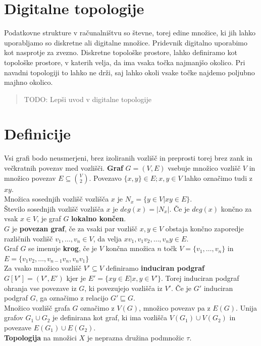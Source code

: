 \documentclass[a4paper, 12pt]{book}
\theoremstyle{definition}
\begin{document}
\section{Digitalne topologije}
Podatkovne strukture v računalništvu so števne, torej edine množice, ki jih lahko
uporabljamo so diskretne ali digitalne množice. Pridevnik digitalno uporabimo kot
nasprotje za zvezno. Diskretne topološke prostore, lahko definiramo kot topološke prostore,
v katerih velja, da ima vsaka točka najmanjšo okolico. Pri navadni topologiji to
lahko ne drži, saj lahko okoli vsake točke najdemo poljubno majhno okolico. 
\begin{quote}
    TODO: Lepši uvod v digitalne topologije
\end{quote}

\section{Definicije}
Vsi grafi bodo neusmerjeni, brez izoliranih vozlišč in preprosti torej brez zank
in večkratnih povezav med vozlišči.
\textbf{Graf} $G = (V,E)$ vsebuje množico vozlišč $V$ in množico povezav $E \subseteq \binom{V}{2}$.
Povezavo $\{x,y\} \in E; x,y \in V$ lahko označimo tudi z $xy$.\\
Množica sosednjih vozlišč vozlišča $x$ je $N_x = \{y \in V | xy \in E\}$.\\
Število sosednjih vozlišč vozlišča $x$ je $deg(x) = |N_x|$. Če je $deg(x)$ končno
za vsak $x \in V$, je graf $G$ \textbf{lokalno končen}.\\
$G$ je \textbf{povezan graf}, če za vsaki par vozlišč $x,y \in V$ obstaja končno
zaporedje različnih vozlišč $v_1,\dots,v_n \in V$, da velja $xv_1, v_1v_2, \dots, v_n y \in E$.\\
Graf $G$ se imenuje \textbf{krog}, če je $V$ končna množica $n$ točk $V=\{v_1,\dots,v_n\}$ in
$E=\{v_1 v_2,\dots,v_{n-1}v_n,v_n v_1\}$ \\
Za vsako množico vozlišč $V' \subseteq V$ definiramo \textbf{induciran podgraf} $G[V'] = (V',E')$
kjer je $E' = \{xy \in E | x,y \in V'\}$. Torej induciran podgraf ohranja vse povezave
iz $G$, ki povezujejo vozlišča iz $V'$. Če je $G'$ induciran podgraf $G$,
ga označimo z relacijo $G' \sqsubseteq  G$.\\
Množico vozlišč grafa $G$ označimo z $V(G)$, množico povezav pa z $E(G)$. Unija
grafov $G_1 \cup G_2$ je definirana kot graf, ki ima vozlišča $V(G_1) \cup V(G_2)$
in povezave $E(G_1) \cup E(G_2)$.\\
\textbf{Topologija} na množici $X$ je neprazna družina podmnožic $\tau$.
\end{document}

